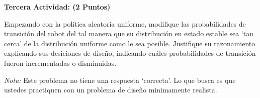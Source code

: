 \documentclass[ a4paper, twoside, 11pt]{article}
\begin{document}
\begin{problem}
\textbf{Tercera Actividad: (2 Puntos)}

Empezando con la pol\'itica aleatoria uniforme, modifique las probabilidades de transici\'on del robot del tal manera que su distribuci\'on en estado estable sea `tan cerca' de la distribuci\'on uniforme como le sea posible. Justifique su razonamiento explicando sus desiciones de dise\~no, \eg indicando cu\'ales probabilidades de transici\'on fueron incrementadas o disminuidas. 

\emph{Nota:} Este problema no tiene una respuesta `correcta'. Lo que busca es que ustedes practiquen con un problema de dise\~no minimamente realista. 

\end{problem}
\vspace{\baselineskip}
\end{document}
